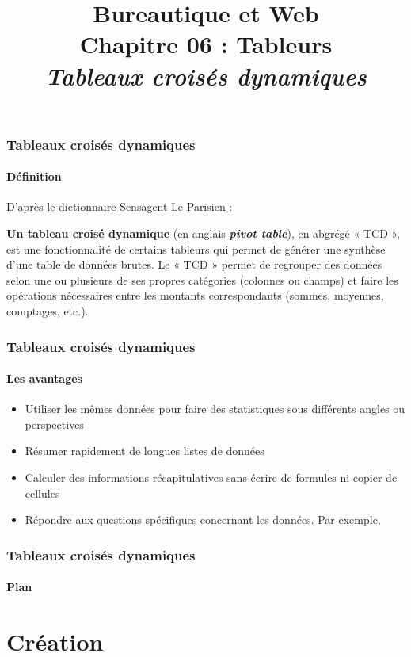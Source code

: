 \documentclass[xcolor=table, usenames,dvipsnames]{beamer}
\title[BWEB : 06- Tableaux croisés dynamiques] %
{Bureautique et Web \\Chapitre 06 : Tableurs \\ \slshape\small  Tableaux croisés dynamiques}
\begin{document}
\begin{frame}
\frametitle{Tableaux croisés dynamiques}
\framesubtitle{Définition}

D'après le dictionnaire \href{http://dictionnaire.sensagent.leparisien.fr/Tableau\%20crois\%C3\%A9\%20dynamique/fr-fr/}{Sensagent Le Parisien} :

\begin{definition}
	\textbf{Un tableau croisé dynamique} (en anglais \textbf{\textit{pivot table}}), en abgrégé « TCD », est une fonctionnalité de certains tableurs qui permet de générer une synthèse d'une table de données brutes. Le « TCD » permet de regrouper des données selon une ou plusieurs de ses propres catégories (colonnes ou champs) et faire les opérations nécessaires entre les montants correspondants (sommes, moyennes, comptages, etc.). 
\end{definition}

\end{frame}
	
\begin{frame}
\frametitle{Tableaux croisés dynamiques}
\framesubtitle{Les avantages}
\begin{itemize}
	\item Utiliser les mêmes données pour faire des statistiques sous différents angles ou perspectives
	\item Résumer rapidement de longues listes de données
	\item Calculer des informations récapitulatives sans écrire de formules ni copier de cellules
	\item Répondre aux questions spécifiques concernant les données. Par exemple, 
\end{itemize}
\end{frame}

\begin{frame}
\frametitle{Tableaux croisés dynamiques}
\framesubtitle{Plan}

\begin{multicols}{2}
	\tableofcontents
\end{multicols}
\end{frame}

\section{Création}
\end{document}
